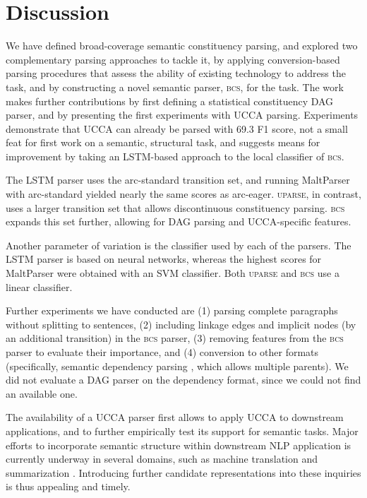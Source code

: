 \documentclass[11pt]{article}
\begin{document}
\section{Discussion}\label{sec:discussion}

We have defined broad-coverage semantic constituency parsing,
and explored two complementary parsing approaches to tackle it, by applying
conversion-based parsing procedures that assess the ability of existing
technology to address the task, and by constructing a novel semantic parser, \textsc{bcs}, for
the task. The work makes further contributions
by first defining a statistical constituency DAG parser,
and by presenting the first experiments with UCCA parsing.
Experiments demonstrate that UCCA can already be parsed with 69.3 F1 score, not a small
feat for first work on a semantic, structural task, and suggests means for
improvement by taking an LSTM-based approach to the local classifier of \textsc{bcs}.

The LSTM parser uses the arc-standard transition set, and
running MaltParser with arc-standard yielded nearly the same scores as arc-eager.
\textsc{uparse}, in contrast, uses a larger transition set that allows discontinuous constituency parsing.
\textsc{bcs} expands this set further, allowing for DAG parsing and UCCA-specific features.

Another parameter of variation is the classifier used by each of the parsers.
The LSTM parser is based on neural networks, whereas the highest scores for MaltParser were obtained with an SVM classifier.
Both \textsc{uparse} and \textsc{bcs} use a linear classifier.

Further experiments we have conducted are
(1) parsing complete paragraphs without splitting to sentences,
(2) including linkage edges and implicit nodes (by an additional transition) in the \textsc{bcs} parser,
(3) removing features from the \textsc{bcs} parser to evaluate their importance,
and (4) conversion to other formats (specifically, semantic dependency parsing \cite{oepen2015semeval}, which allows multiple parents).
We did not evaluate a DAG parser \cite{tokgoz2015transition} on the dependency format, since we could not find an available one.

The availability of a UCCA parser first allows to apply UCCA to downstream applications,
and to further empirically test its support for semantic tasks. Major efforts to incorporate
semantic structure within downstream NLP application is currently underway in several
domains, such as machine translation \cite{jones2012semantics} and summarization \cite{liu2015toward}.
Introducing further candidate
representations into these inquiries is thus appealing and timely.
\end{document}
